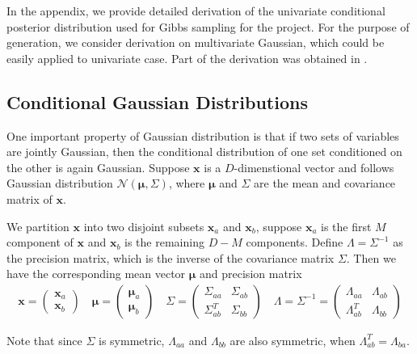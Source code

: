 In the appendix, we provide detailed derivation of the univariate conditional posterior distribution used for Gibbs sampling for the project. For the purpose of generation, we consider derivation on multivariate Gaussian, which could be easily applied to univariate case. Part of the derivation was obtained in \cite{Bishop:2006:PRM:1162264}.
\subsection{Conditional Gaussian Distributions}
{\setlength{\parindent}{0cm}
One important property of Gaussian distribution is that if two sets of variables are jointly Gaussian, then the conditional distribution of one set conditioned on the other is again Gaussian.
Suppose $\mathbf{x}$ is a $D$-dimenstional vector and follows Gaussian distribution $\mathcal{N}\left(\mathbf{\mu},\Sigma\right)$, where $\mathbf{\mu}$ and $\Sigma$ are the mean and covariance matrix of $\mathbf{x}$.

We partition $\mathbf{x}$ into two disjoint subsets $\mathbf{x}_a$ and $\mathbf{x}_b$, suppose $\mathbf{x}_a$ is the first $M$ component of $\mathbf{x}$ and $\mathbf{x}_b$ is the remaining $D-M$ components. Define $\Lambda = \Sigma^{-1}$ as the precision matrix, which is the inverse of the covariance matrix $\Sigma$. Then we have the corresponding mean vector $\mathbf{\mu}$ and precision matrix
\begin{align}
\mathbf{x}=\begin{pmatrix} \mathbf{x}_a \\ \mathbf{x}_b \end{pmatrix}
\quad
\mathbf{\mu}=\begin{pmatrix} \mathbf{\mu}_a \\ \mathbf{\mu}_b \end{pmatrix}
\quad
\Sigma = \begin{pmatrix} 
\Sigma_{aa} & \Sigma_{ab} \\
\Sigma_{ab}^{T} & \Sigma_{bb} 
\end{pmatrix}
\quad
\Lambda = \Sigma^{-1}=\begin{pmatrix} 
\Lambda_{aa} & \Lambda_{ab} \\
\Lambda_{ab}^{T} & \Lambda_{bb} 
\end{pmatrix}
\label{eq:partition}
\end{align}

Note that since $\Sigma$ is symmetric, $\Lambda_{aa}$ and $\Lambda_{bb}$ are also symmetric, when $\Lambda_{ab}^T = \Lambda_{ba}$.

}
